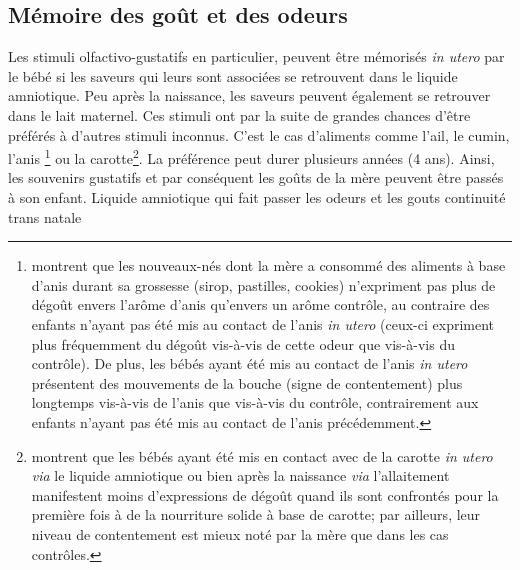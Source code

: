 \documentclass[french]{article}
\begin{document}
			\subsection{Mémoire des goût et des odeurs}
				Les stimuli olfactivo-gustatifs en particulier, peuvent être mémorisés \textit{in utero} par le bébé si les saveurs qui leurs sont associées se retrouvent dans le liquide amniotique. Peu après la naissance, les saveurs peuvent également se retrouver dans le lait maternel. Ces stimuli ont par la suite de grandes chances d'être préférés à d'autres stimuli inconnus. C'est le cas d'aliments comme l'ail, le cumin, l'anis \cite{schaal2000}\footnote{\cite{schaal2000} montrent que les nouveaux-nés dont la mère a consommé des aliments à base d'anis durant sa grossesse (sirop, pastilles, cookies) n'expriment pas plus de dégoût envers l'arôme d'anis qu'envers un arôme contrôle, au contraire des enfants n'ayant pas été mis au contact de l'anis \textit{in utero} (ceux-ci expriment plus fréquemment du dégoût vis-à-vis de cette odeur que vis-à-vis du contrôle). De plus, les bébés ayant été mis au contact de l'anis \textit{in utero} présentent des mouvements de la bouche (signe de contentement) plus longtemps vis-à-vis de l'anis que vis-à-vis du contrôle, contrairement aux enfants n'ayant pas été mis au contact de l'anis précédemment.} ou la carotte\cite{mennella2001}\footnote{\cite{mennella2001} montrent que les bébés ayant été mis en contact avec de la carotte \textit{in utero via} le liquide amniotique ou bien après la naissance \textit{via} l'allaitement manifestent moins d'expressions de dégoût quand ils sont confrontés pour la première fois à de la nourriture solide à base de carotte; par ailleurs, leur niveau de contentement est mieux noté par la mère que dans les cas contrôles.}. La préférence peut durer plusieurs années (4 ans). Ainsi, les souvenirs gustatifs et par conséquent les goûts de la mère peuvent être passés à son enfant.
				Liquide amniotique qui fait passer les odeurs et les gouts
				continuité trans natale\\
\end{document}
